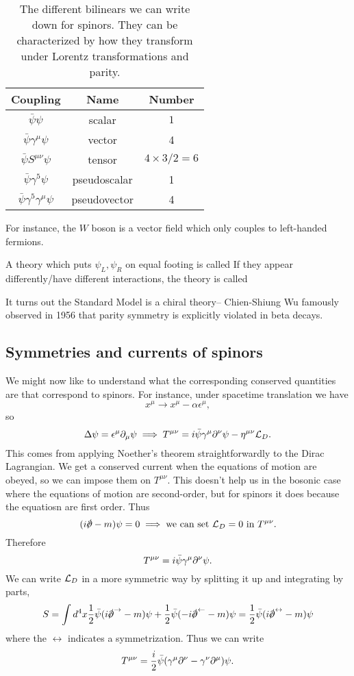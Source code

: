 \begin{table}[]
    \centering
    \begin{tabular}{|c|c|c|}
        \hline
        Coupling & Name & Number \\ \hline
         $\bar\psi \psi$ & scalar & $1$\\ \hline
         $\bar \psi \gamma^\mu \psi$ & vector & 4\\ \hline
         $\bar \psi S^{\mu\nu}\psi$ & tensor & $4\times 3/2=6$\\ \hline
         $\bar \psi \gamma^5 \psi$ & pseudoscalar & 1\\ \hline
         $\bar \psi \gamma^5 \gamma^\mu \psi$ & pseudovector & 4\\ \hline
    \end{tabular}
    \caption{The different bilinears we can write down for spinors. They can be characterized by how they transform under Lorentz transformations and parity.}
    \label{tab:bilinears}
\end{table}

For instance, the $W$ boson is a vector field which only couples to left-handed fermions. 
\begin{defn}
A theory which puts $\psi_L,\psi_R$ on equal footing is called  If they appear differently/have different interactions, the theory is called 

It turns out the Standard Model is a chiral theory-- Chien-Shiung Wu famously observed in 1956 that parity symmetry is explicitly violated in beta decays.
\end{defn}

\subsection*{Symmetries and currents of spinors} We might now like to understand what the corresponding conserved quantities are that correspond to spinors. For instance, under spacetime translation we have
$$x^\mu \to x^\mu -\alpha \epsilon^\mu,$$
so
$$\Delta \psi=\epsilon^\mu \partial_\mu \psi \implies T^{\mu\nu}=i \bar \psi \gamma^\mu \partial^\nu \psi-\eta^{\mu\nu}\mathcal L_D.$$
This comes from applying Noether's theorem straightforwardly to the Dirac Lagrangian.
We get a conserved current when the equations of motion are obeyed, so we can impose them on $T^{\mu\nu}$. This doesn't help us in the bosonic case where the equations of motion are second-order, but for spinors it does because the equatiosn are first order. Thus
$$(i\slashed{\p}-m)\psi=0 \implies \text{we can set }\cL_D=0\text{ in }T^{\mu\nu}.$$
Therefore
$$T^{\mu\nu}=i\bar \psi \gamma^\mu \partial^\nu \psi.$$
We can write $\mathcal L_D$ in a more symmetric way by splitting it up and integrating by parts,
$$S=\int d^4x \frac{1}{2} \bar \psi(i \slashed{\p}^\rightarrow -m)\psi+\frac{1}{2}\bar \psi(-i \slashed{\p}^\leftarrow - m)\psi = \frac{1}{2} \bar \psi (i \slashed{\p}^\leftrightarrow - m)\psi$$
where the $\leftrightarrow$ indicates a symmetrization. Thus we can write
$$T^{\mu\nu}=\frac{i}{2}\bar\psi (\gamma^\mu \partial^\nu- \gamma^\nu \partial^\mu)\psi.$$